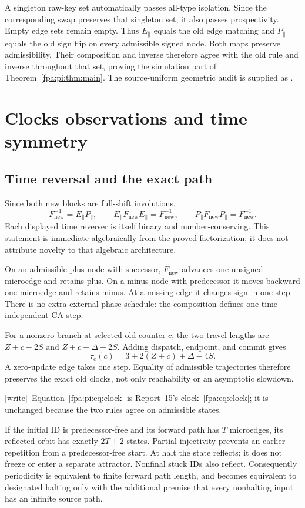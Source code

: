 \documentclass[11pt,a4paper]{article}
\numberwithin{equation}{section}
\newcommand{\parE}{E_{\parallel}}\newcommand{\parP}{P_{\parallel}}
\newcommand{\Fnew}{F_{\mathrm{new}}}\newcommand{\Fold}{F_{\mathrm{old}}}
\newcommand{\file}[1]{\texttt{\detokenize{#1}}}
\newcommand{\wtag}{\textup{[write]}}
\begin{document}
A singleton raw-key set automatically passes all-type isolation. Since the corresponding swap preserves that singleton set, it also passes prospectivity. Empty edge sets remain empty. Thus $\parE$ equals the old edge matching and $\parP$ equals the old sign flip on every admissible signed node. Both maps preserve admissibility. Their composition and inverse therefore agree with the old rule and inverse throughout that set, proving the simulation part of Theorem~\ref{fpa:pi:thm:main}. The source-uniform geometric audit is supplied as \file{scientific/audit-preservation.md}.

\section{Clocks observations and time symmetry}\label{fpa:pi:sec:clocks}
\subsection{Time reversal and the exact path}
Since both new blocks are full-shift involutions,
\[
 \Fnew^{-1}=\parE\parP,
 \qquad \parE\Fnew\parE=\Fnew^{-1},
 \qquad \parP\Fnew\parP=\Fnew^{-1}.
\]
Each displayed time reverser is itself binary and number-conserving. This statement is immediate algebraically from the proved factorization; it does not attribute novelty to that algebraic architecture.

On an admissible plus node with successor, $\Fnew$ advances one unsigned microedge and retains plus. On a minus node with predecessor it moves backward one microedge and retains minus. At a missing edge it changes sign in one step. There is no extra external phase schedule: the composition defines one time-independent CA step.

For a nonzero branch at selected old counter $c$, the two travel lengths are $Z+c-2S$ and $Z+c+\Delta-2S$. Adding dispatch, endpoint, and commit gives
\begin{equation}\label{fpa:pi:eq:clock}
 \tau_e(c)=3+2(Z+c)+\Delta-4S.
\end{equation}
A zero-update edge takes one step. Equality of admissible trajectories therefore preserves the exact old clocks, not only reachability or an asymptotic slowdown.

\wtag\ Equation~\eqref{fpa:pi:eq:clock} is Report~15's clock~\eqref{fpa:eq:clock}; it is unchanged because the two rules agree on admissible states.

If the initial ID is predecessor-free and its forward path has $T$ microedges, its reflected orbit has exactly $2T+2$ states. Partial injectivity prevents an earlier repetition from a predecessor-free start. At halt the state reflects; it does not freeze or enter a separate attractor. Nonfinal stuck IDs also reflect. Consequently periodicity is equivalent to finite forward path length, and becomes equivalent to designated halting only with the additional premise that every nonhalting input has an infinite source path.
\end{document}
